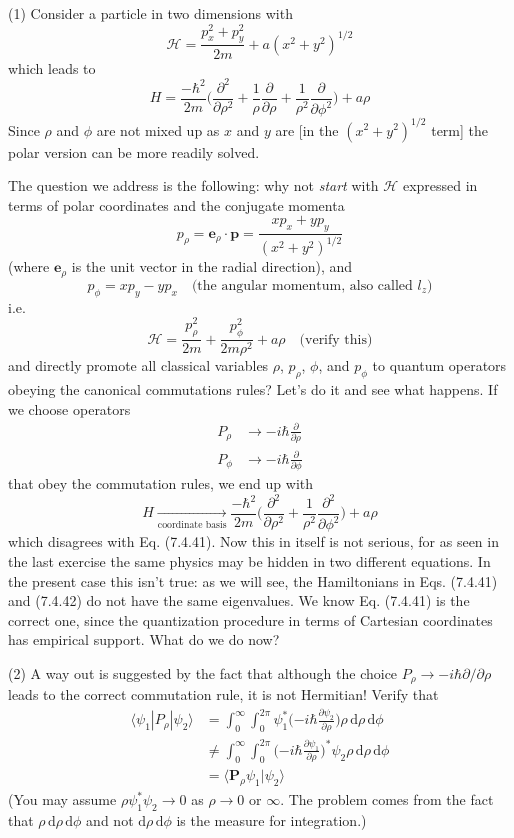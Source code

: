 \documentclass[../principles-of-quantum-mechanics.tex]{subfiles}
\begin{document}
\begin{questions}
		(1) Consider a particle in two dimensions with
		$$\mathcal{H} = \frac{p_x^2 + p_y^2}{2m} + a(x^2 + y^2)^{1/2}$$
		which leads to 
		$$H = \frac{-\hbar^2}{2m}\Big(\frac{\partial^2}{\partial \rho^2} + \frac{1}{\rho}\frac{\partial}{\partial \rho} + \frac{1}{\rho^2}\frac{\partial}{\partial \phi^2}\Big) + a\rho$$
		Since $\rho$ and $\phi$ are not mixed up as $x$ and $y$ are [in the $(x^2 + y^2)^{1/2}$ term] the polar version can be more readily solved.
		
		The question we address is the following: why not \textit{start} with $\mathcal{H}$ expressed in terms of polar coordinates and the conjugate momenta
		$$p_\rho = \mathbf{e}_\rho\cdot\mathbf{p} = \frac{xp_x + yp_y}{(x^2 + y^2)^{1/2}}$$
		(where $\mathbf{e}_\rho$ is the unit vector in the radial direction), and 
		$$p_\phi = xp_y - yp_x\quad\text{(the angular momentum, also called }l_z\text{)}$$
		i.e.
		$$\mathcal{H} = \frac{p_\rho^2}{2m} + \frac{p_\phi^2}{2m\rho^2} + a\rho\quad\text{(verify this)}$$
		and directly promote all classical variables $\rho$, $p_\rho$, $\phi$, and $p_\phi$ to quantum operators obeying the canonical commutations rules? Let's do it and see what happens. If we choose operators
		\begin{align*}
			P_\rho &\to {-i\hbar\frac{\partial}{\partial \rho}} \\
			P_\phi &\to {-i\hbar\frac{\partial}{\partial \phi}} 
		\end{align*}
		that obey the commutation rules, we end up with
		$$H \xrightarrow[\text{coordinate basis}]{} \frac{-\hbar^2}{2m}\Big(\frac{\partial^2}{\partial \rho^2} + \frac{1}{\rho^2}\frac{\partial^2}{\partial \phi^2}\Big) + a\rho$$
		which disagrees with Eq. (7.4.41). Now this in itself is not serious, for as seen in the last exercise the same physics may be hidden in two different equations. In the present case this isn't true: as we will see, the Hamiltonians in Eqs. (7.4.41) and (7.4.42) do not have the same eigenvalues. We know Eq. (7.4.41) is the correct one, since the quantization procedure in terms of Cartesian coordinates has empirical support. What do we do now?
		
		(2) A way out is suggested by the fact that although the choice $P_\rho \to {-i\hbar \partial/\partial \rho}$ leads to the correct commutation rule, it is not Hermitian! Verify that
		\begin{align*}
			\langle \psi_1| P_\rho|\psi_2\rangle &= \int_0^{\infty}\int_0^{2\pi}\psi_1^*\Big({-i\hbar\frac{\partial \psi_2}{\partial \rho}}\Big)\rho\,\mathrm{d}\rho\,\mathrm{d}\phi \\
			&\neq \int_0^{\infty}\int_0^{2\pi}\Big({-i\hbar\frac{\partial \psi_1}{\partial \rho}}\Big)^*\psi_2\rho\,\mathrm{d}\rho\,\mathrm{d}\phi \\
			&= \langle \mathbf{P}_\rho\psi_1|\psi_2\rangle
		\end{align*}
		(You may assume $\rho\psi_1^*\psi_2 \to 0$ as $\rho \to 0$ or $\infty$. The problem comes from the fact that $\rho\,\mathrm{d}\rho\,\mathrm{d}\phi$ and not $\mathrm{d}\rho\,\mathrm{d}\phi$ is the measure for integration.)
		

\end{questions}
\end{document}
